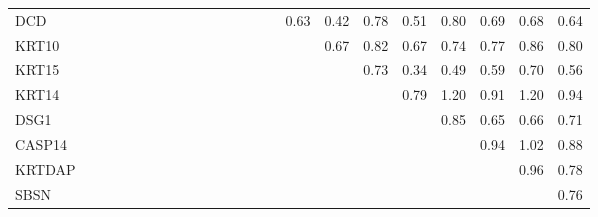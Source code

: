 \begin{longtable}{lrrrrrrrrrrrrrrrrrrrrrr}
DCD    &            &              &           &            &            &              &              &              &             &             &            &            &            &           &        0.63 &        0.42 &        0.78 &       0.51 &         0.80 &         0.69 &       0.68 &          0.64 \\
KRT10  &            &              &           &            &            &              &              &              &             &             &            &            &            &           &             &        0.67 &        0.82 &       0.67 &         0.74 &         0.77 &       0.86 &          0.80 \\
KRT15  &            &              &           &            &            &              &              &              &             &             &            &            &            &           &             &             &        0.73 &       0.34 &         0.49 &         0.59 &       0.70 &          0.56 \\
KRT14  &            &              &           &            &            &              &              &              &             &             &            &            &            &           &             &             &             &       0.79 &         1.20 &         0.91 &       1.20 &          0.94 \\
DSG1   &            &              &           &            &            &              &              &              &             &             &            &            &            &           &             &             &             &            &         0.85 &         0.65 &       0.66 &          0.71 \\
CASP14 &            &              &           &            &            &              &              &              &             &             &            &            &            &           &             &             &             &            &              &         0.94 &       1.02 &          0.88 \\
KRTDAP &            &              &           &            &            &              &              &              &             &             &            &            &            &           &             &             &             &            &              &              &       0.96 &          0.78 \\
SBSN   &            &              &           &            &            &              &              &              &             &             &            &            &            &           &             &             &             &            &              &              &            &          0.76 \\
\end{longtable}


